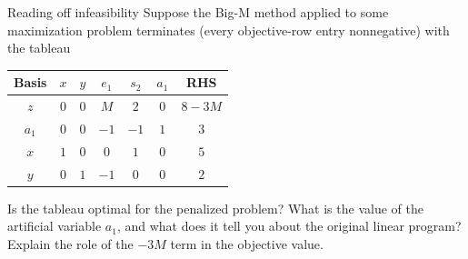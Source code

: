 \begin{ex}{Reading off infeasibility}{}
\label{ex:tableau-infeasible}
 Suppose the Big-M method applied to some maximization problem terminates (every objective-row entry nonnegative) with the tableau
\begin{center}
\renewcommand{\arraystretch}{1.3}\small\setlength{\tabcolsep}{4.5pt}
\begin{tabular}{c|ccccc|c}
\toprule
Basis & $x$ & $y$ & $e_1$ & $s_2$ & $a_1$ & RHS\\
\midrule
$z$   & $0$ & $0$ & $M$ & $2$ & $0$ & $8-3M$\\
\midrule
$a_1$ & $0$ & $0$ & $-1$ & $-1$ & $1$ & $3$\\
$x$   & $1$ & $0$ & $0$ & $1$ & $0$ & $5$\\
$y$   & $0$ & $1$ & $-1$ & $0$ & $0$ & $2$\\
\bottomrule
\end{tabular}
\end{center}
Is the tableau optimal for the penalized problem? What is the value of the artificial variable $a_1$, and what does it tell you about the original linear program? Explain the role of the $-3M$ term in the objective value.
\exrefs{\S\ref{sec:tableau-bigm}}
\end{ex}


